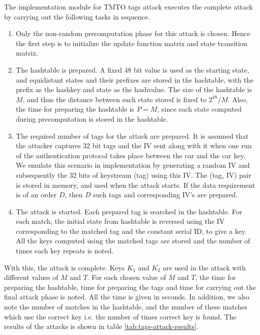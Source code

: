 The implementation module for TMTO tags attack executes the complete attack by carrying out the following tasks in sequence. 

\begin{enumerate}

\item Only the non-random precomputation phase for this attack is chosen. Hence the first step is to initialize the update function matrix and state transition matrix.
\item The hashtable is prepared. A fixed 48 bit value is used as the starting state, and equidistant states and their prefixes are stored in the hashtable, with the prefix as the hashkey and state as the hashvalue. The size of the hashtable is $M$, and thus the distance between each state stored is fixed to $2^{48}/M$. Also, the time for preparing the hashtable is $P = M$, since each state computed during precomputation is stored in the hashtable.  
\item The required number of tags for the attack are prepared. It is assumed that the attacker captures 32 bit tags and the IV sent along with it when one run of the authentication protocol takes place between the car and the car key. We emulate this scenario in implementation by generating a random IV and subsequently the 32 bits of keystream (tag) using this IV. The (tag, IV) pair is stored in memory, and used when the attack starts. If the data requirement is of an order $D$, then $D$ such tags and corresponding IV's are prepared. 
\item The attack is started. Each prepared tag is searched in the hashtable. For each match, the initial state from hashtable is reversed using the IV corresponding to the matched tag and the constant serial ID, to give a key. All the keys computed using the matched tags are stored and the number of times each key repeats is noted. 
\end{enumerate}

With this, the attack is complete. Keys $K_1$ and $K_2$ are used in the attack with different values of $M$ and $T$. For each chosen value of $M$ and $T$, the time for preparing the hashtable, time for preparing the tags and time for carrying out the final attack phase is noted. All the time is given in seconds. In addition, we also note the number of matches in the hashtable, and the number of these matches which use the correct key i.e. the number of times correct key is found. The results of the attacks is shown in table \ref{tab:tags-attack-results}.

